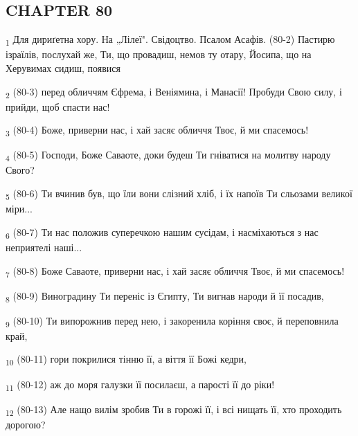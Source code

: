 \subsection{CHAPTER 80}
\begin{tcolorbox}
\textsubscript{1} Для дириґетна хору. На „Лілеї". Свідоцтво. Псалом Асафів. (80-2) Пастирю ізраїлів, послухай же, Ти, що провадиш, немов ту отару, Йосипа, що на Херувимах сидиш, появися
\end{tcolorbox}
\begin{tcolorbox}
\textsubscript{2} (80-3) перед обличчям Єфрема, і Веніямина, і Манасії! Пробуди Свою силу, і прийди, щоб спасти нас!
\end{tcolorbox}
\begin{tcolorbox}
\textsubscript{3} (80-4) Боже, приверни нас, і хай засяє обличчя Твоє, й ми спасемось!
\end{tcolorbox}
\begin{tcolorbox}
\textsubscript{4} (80-5) Господи, Боже Саваоте, доки будеш Ти гніватися на молитву народу Свого?
\end{tcolorbox}
\begin{tcolorbox}
\textsubscript{5} (80-6) Ти вчинив був, що їли вони слізний хліб, і їх напоїв Ти сльозами великої міри...
\end{tcolorbox}
\begin{tcolorbox}
\textsubscript{6} (80-7) Ти нас положив суперечкою нашим сусідам, і насміхаються з нас неприятелі наші...
\end{tcolorbox}
\begin{tcolorbox}
\textsubscript{7} (80-8) Боже Саваоте, приверни нас, і хай засяє обличчя Твоє, й ми спасемось!
\end{tcolorbox}
\begin{tcolorbox}
\textsubscript{8} (80-9) Виноградину Ти переніс із Єгипту, Ти вигнав народи й її посадив,
\end{tcolorbox}
\begin{tcolorbox}
\textsubscript{9} (80-10) Ти випорожнив перед нею, і закоренила коріння своє, й переповнила край,
\end{tcolorbox}
\begin{tcolorbox}
\textsubscript{10} (80-11) гори покрилися тінню її, а віття її Божі кедри,
\end{tcolorbox}
\begin{tcolorbox}
\textsubscript{11} (80-12) аж до моря галузки її посилаєш, а парості її до ріки!
\end{tcolorbox}
\begin{tcolorbox}
\textsubscript{12} (80-13) Але нащо вилім зробив Ти в горожі її, і всі нищать її, хто проходить дорогою?
\end{tcolorbox}
